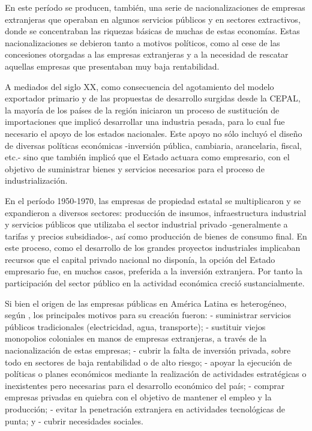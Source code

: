 \documentclass[
  12pt,
  spanish,
]{book}
\begin{document}
En este período se producen, también, una serie de nacionalizaciones de
empresas extranjeras que operaban en algunos servicios públicos y en
sectores extractivos, donde se concentraban las riquezas básicas de
muchas de estas economías. Estas nacionalizaciones se debieron tanto a
motivos políticos, como al cese de las concesiones otorgadas a las
empresas extranjeras y a la necesidad de rescatar aquellas empresas que
presentaban muy baja rentabilidad.

A mediados del siglo XX, como consecuencia del agotamiento del modelo
exportador primario y de las propuestas de desarrollo surgidas desde la
CEPAL, la mayoría de los países de la región iniciaron un proceso de
sustitución de importaciones que implicó desarrollar una industria
pesada, para lo cual fue necesario el apoyo de los estados nacionales.
Este apoyo no sólo incluyó el diseño de diversas políticas económicas
-inversión pública, cambiaria, arancelaria, fiscal, etc.- sino que
también implicó que el Estado actuara como empresario, con el objetivo
de suministrar bienes y servicios necesarios para el proceso de
industrialización.

En el período 1950-1970, las empresas de propiedad estatal se
multiplicaron y se expandieron a diversos sectores: producción de
insumos, infraestructura industrial y servicios públicos que utilizaba
el sector industrial privado -generalmente a tarifas y precios
subsidiados-, así como producción de bienes de consumo final. En este
proceso, como el desarrollo de los grandes proyectos industriales
implicaban recursos que el capital privado nacional no disponía, la
opción del Estado empresario fue, en muchos casos, preferida a la
inversión extranjera. Por tanto la participación del sector público en
la actividad económica creció sustancialmente.

Si bien el origen de las empresas públicas en América Latina es
heterogéneo, según \citet{Morales1990}, los principales motivos para su
creación fueron: - suministrar servicios públicos tradicionales
(electricidad, agua, transporte); - sustituir viejos monopolios
coloniales en manos de empresas extranjeras, a través de la
nacionalización de estas empresas; - cubrir la falta de inversión
privada, sobre todo en sectores de baja rentabilidad o de alto riesgo; -
apoyar la ejecución de políticas o planes económicos mediante la
realización de actividades estratégicas o inexistentes pero necesarias
para el desarrollo económico del país; - comprar empresas privadas en
quiebra con el objetivo de mantener el empleo y la producción; - evitar
la penetración extranjera en actividades tecnológicas de punta; y -
cubrir necesidades sociales.
\end{document}
